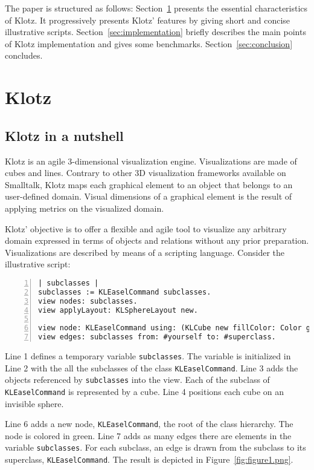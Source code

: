 \documentclass{sig-alternate}
\newcommand{\ct}{\lstinline[backgroundcolor=\color{white},basicstyle=\footnotesize\ttfamily]}
\newcommand{\seclabel}[1]{\label{sec:#1}}
\newcommand{\figref}[1]{Figure~\ref{fig:#1}}
\newcommand{\secref}[1]{Section~\ref{sec:#1}}
\begin{document}
The paper is structured as follows:
\secref{klotz} presents the essential characteristics of Klotz. It progressively presents Klotz' features by giving short and concise illustrative scripts. 
\secref{implementation} briefly describes the main points of Klotz implementation and gives some benchmarks.
\secref{conclusion} concludes.



\section{Klotz} \seclabel{klotz}

\subsection{Klotz in a nutshell} \seclabel{nutshell}
Klotz is an agile 3-dimensional visualization engine. Visualizations are made of cubes and lines. Contrary to other 3D visualization frameworks available on Smalltalk, Klotz maps each graphical element to an object that belongs to an user-defined domain. Visual dimensions of a graphical element is the result of applying metrics on the visualized domain. 

Klotz' objective is to offer a flexible and agile tool to visualize any arbitrary domain expressed in terms of objects and relations without any prior preparation. Visualizations are described by means of a scripting language. Consider the illustrative script:

\begin{lstlisting}[numbers=left]
| subclasses |
subclasses := KLEaselCommand subclasses.
view nodes: subclasses.
view applyLayout: KLSphereLayout new.

view node: KLEaselCommand using: (KLCube new fillColor: Color green).
view edges: subclasses from: #yourself to: #superclass.   
\end{lstlisting}

Line 1 defines a temporary variable \ct{subclasses}. 
The variable is initialized in Line 2 with the all the subclasses of the class \ct{KLEaselCommand}.
Line 3 adds the objects referenced by \ct{subclasses} into the view. Each of the subclass of \ct{KLEaselCommand} is represented by a cube.
Line 4 positions each cube on an invisible sphere.

Line 6 adds a new node, \ct{KLEaselCommand}, the root of the class hierarchy. The node is colored in green.
Line 7 adds as many edges there are elements in the variable \ct{subclasses}. For each subclass, an edge is drawn from the subclass to its superclass, \ct{KLEaselCommand}. The result is depicted in \figref{figure1.png}.
\end{document}
